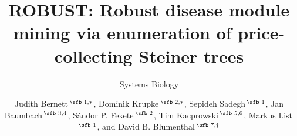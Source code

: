 \documentclass{bioinfo}
\begin{document}

\subtitle{Systems Biology}

\title[Robust disease module mining]{ROBUST: Robust disease module mining via enumeration of  price-collecting Steiner trees} 
\author[Bernett \textit{et~al}.]{%
Judith Bernett\,$^{\text{\sfb 1,}*}$, %
Dominik Krupke\,$^{\text{\sfb 2,}*}$, %
Sepideh Sadegh\,$^{\text{\sfb 1}}$, %
Jan Baumbach\,$^{\text{\sfb 3,4}}$, %
S\'andor P. Fekete\,$^{\text{\sfb 2}}$, %
Tim Kacprowski\,$^{\text{\sfb 5,6}}$, %
Markus List\,$^{\text{\sfb 1}}$, %
and David B. Blumenthal\,$^{\text{\sfb 7,}\dagger}$}



\address{%
$^{\text{\sf 1}}$Chair of Experimental Bioinformatics, TUM School of Life Sciences, Technical University of Munich, Freising, Germany \\
$^{\text{\sf 2}}$Institute of Operating Systems and Computer Networks, Technical University of Brunswick, Brunswick, Germany\\
$^{\text{\sf 3}}$Chair of Computational Systems Biology, University of Hamburg, Hamburg, Germany\\
$^{\text{\sf 4}}$Department of Mathematics and Computer Science, University of Southern Denmark, Odense, Denmark\\
$^{\text{\sf 5}}$Division of Data Science in Biomedicine, Peter L. Reichertz Institute for Medical Informatics, Technical University of Brunswick and Hannover Medical School, Brunswick, Germany\\
$^{\text{\sf 6}}$Braunschweig Integrated Centre of Systems Biology (BRICS), Brunswick, Germany\\
$^{\text{\sf 7}}$Department Artificial Intelligence in Biomedical Engineering, Friedrich-Alexander University Erlangen-Nürnberg, Erlangen, Germany}



\end{document}
